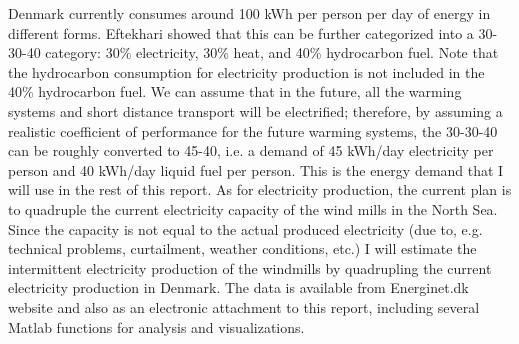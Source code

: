 \documentclass{ECOS_2021}
\begin{document}
Denmark currently consumes around 100 kWh per person per day of energy
in different forms. Eftekhari \cite{eftekhari_quantifying_2020} showed
that this can be further categorized into a 30-30-40 category: 30\%
electricity, 30\% heat, and 40\% hydrocarbon fuel. Note that the hydrocarbon
consumption for electricity production is not included in the 40\%
hydrocarbon fuel. We can assume that in the future, all the warming
systems and short distance transport will be electrified; therefore,
by assuming a realistic coefficient of performance for the future
warming systems, the 30-30-40 can be roughly converted to 45-40, i.e.
a demand of 45 kWh/day electricity per person and 40 kWh/day liquid
fuel per person. This is the energy demand that I will use in the
rest of this report. As for electricity production, the current plan
is to quadruple the current electricity capacity of the wind mills
in the North Sea. Since the capacity is not equal to the actual produced
electricity (due to, e.g. technical problems, curtailment, weather
conditions, etc.) I will estimate the intermittent electricity production
of the windmills by quadrupling the current electricity production
in Denmark. The data is available from Energinet.dk website and also
as an electronic attachment to this report, including several Matlab
functions for analysis and visualizations.
\end{document}
